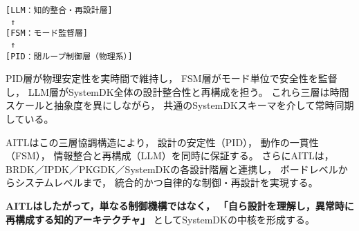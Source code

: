 \begin{center}
\texttt{[LLM：知的整合・再設計層]}\\
\texttt{     ↑}\\
\texttt{[FSM：モード監督層]}\\
\texttt{     ↑}\\
\texttt{[PID：閉ループ制御層（物理系）]}
\end{center}

PID層が物理安定性を実時間で維持し，
FSM層がモード単位で安全性を監督し，
LLM層がSystemDK全体の設計整合性と再構成を担う。
これら三層は時間スケールと抽象度を異にしながら，
共通のSystemDKスキーマを介して常時同期している。

AITLはこの三層協調構造により，
設計の安定性（PID），
動作の一貫性（FSM），
情報整合と再構成（LLM）を同時に保証する。
さらにAITLは，
BRDK／IPDK／PKGDK／SystemDKの各設計階層と連携し，
ボードレベルからシステムレベルまで，
統合的かつ自律的な制御・再設計を実現する。

\textbf{AITLはしたがって，単なる制御機構ではなく，}
\textbf{「自ら設計を理解し，異常時に再構成する知的アーキテクチャ」}
としてSystemDKの中核を形成する。
